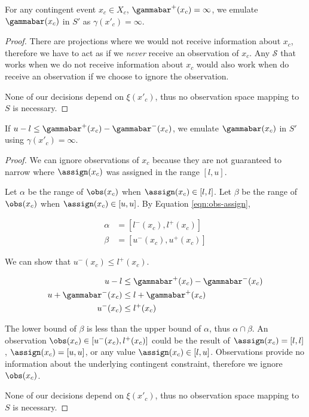 \documentclass[11pt]{article}
\begin{document}
\begin{lemma}
\label{lemma:partially-unobservable}
For any contingent event \(x_c \in X_c\), \(\gammabar^+(x_c) = \infty\), we emulate \(\gammabar(x_c)\) in
\(S'\) as \(\gamma(x'_c) = \infty\).
\end{lemma}

\begin{proof}
There are projections where we would not receive information about \(x_{c}\), therefore we have to act
as if we \emph{never} receive an observation of \(x_{c}\). Any \(\mathcal{S}\) that works when we do not
receive information about \(x_{c}\) would also work when do receive an observation if we choose to
ignore the observation.

None of our decisions depend on \(\xi(x'_{c})\), thus no observation space mapping to \(S\) is
necessary.
\end{proof}

\begin{lemma}
\label{lemma:not-enough-information}
If \(u - l \leq \gammabar^+(x_c) - \gammabar^-(x_c)\), we emulate \(\gammabar(x_c)\) in \(S'\) using
\(\gamma(x'_c) = \infty\).
\end{lemma}

\begin{proof}
We can ignore observations of \(x_{c}\) because they are not guaranteed to narrow where \(\assign(x_c)\)
was assigned in the range \([l, u]\).

Let \(\alpha\) be the range of \(\obs(x_{c})\) when \(\assign(x_{c}) \in [l, l]\). Let \(\beta\) be the
range of \(\obs(x_{c})\) when \(\assign(x_{c}) \in [u, u]\). By Equation \ref{eqn:obs-assign},

\begin{align*}
\alpha &= [l^-(x_{c}), l^+(x_{c})] \\
\beta &= [u^-(x_{c}), u^+(x_{c})]
\end{align*}

We can show that \(u^-(x_{c}) \leq l^+(x_{c})\).

\begin{align*}
u - l &\leq \gammabar^+(x_c) - \gammabar^-(x_{c}) \\
u + \gammabar^-(x_{c}) &\leq l + \gammabar^+(x_{c}) \\
u^-(x_{c}) &\leq l^+(x_{c})
\end{align*}

The lower bound of \(\beta\) is less than the upper bound of \(\alpha\), thus \(\alpha \cap \beta\). An
observation \(\obs(x_{c}) \in [u^-(x_{c}), l^+(x_{c})]\) could be the result of \(\assign(x_{c}) = [l,
l]\), \(\assign(x_{c}) = [u, u]\), or any value \(\assign(x_{c}) \in [l, u]\). Observations provide no
information about the underlying contingent constraint, therefore we ignore \(\obs(x_{c})\).

None of our decisions depend on \(\xi(x'_{c})\), thus no observation space mapping to \(S\) is
necessary.
\end{proof}
\end{document}
